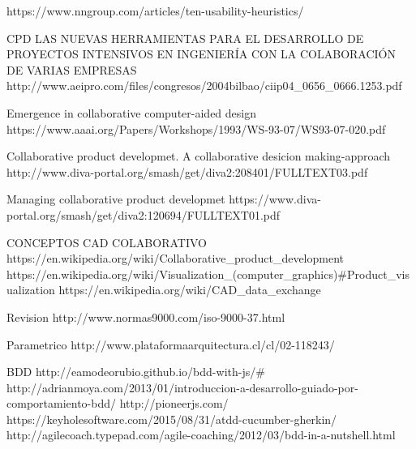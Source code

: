 https://www.nngroup.com/articles/ten-usability-heuristics/





CPD
LAS NUEVAS HERRAMIENTAS PARA EL DESARROLLO DE PROYECTOS INTENSIVOS EN INGENIERÍA CON LA COLABORACIÓN DE VARIAS EMPRESAS
http://www.aeipro.com/files/congresos/2004bilbao/ciip04_0656_0666.1253.pdf

Emergence in collaborative computer-aided design
https://www.aaai.org/Papers/Workshops/1993/WS-93-07/WS93-07-020.pdf

Collaborative product developmet. A collaborative desicion making-approach
http://www.diva-portal.org/smash/get/diva2:208401/FULLTEXT03.pdf

Managing collaborative product developmet
https://www.diva-portal.org/smash/get/diva2:120694/FULLTEXT01.pdf

CONCEPTOS CAD COLABORATIVO
https://en.wikipedia.org/wiki/Collaborative_product_development
https://en.wikipedia.org/wiki/Visualization_(computer_graphics)#Product_visualization
https://en.wikipedia.org/wiki/CAD_data_exchange

Revision
http://www.normas9000.com/iso-9000-37.html

Parametrico
http://www.plataformaarquitectura.cl/cl/02-118243/%


BDD
http://eamodeorubio.github.io/bdd-with-js/#
http://adrianmoya.com/2013/01/introduccion-a-desarrollo-guiado-por-comportamiento-bdd/
http://pioneerjs.com/
https://keyholesoftware.com/2015/08/31/atdd-cucumber-gherkin/
http://agilecoach.typepad.com/agile-coaching/2012/03/bdd-in-a-nutshell.html
